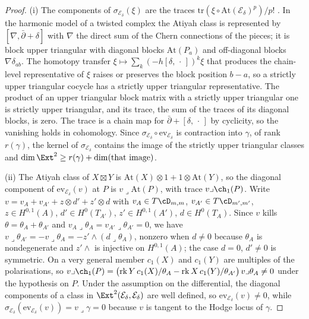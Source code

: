 \begin{proof}
(i) The components of $\sigma_{\mathcal{E}_{\delta}}(\xi)$ are the traces $\mathrm{tr}(\xi\circ\mathrm{At}(\mathcal{E}_{\delta})^{p})/p!$ \cite[Sect.~4]{BF03}. In the harmonic model of a twisted complex the Atiyah class is represented by $[\nabla,\bar\partial+\delta]$ with $\nabla$ the direct sum of the Chern connections of the pieces; it is block upper triangular with diagonal blocks $\mathrm{At}(P_{a})$ and off-diagonal blocks $\nabla\delta_{ab}$. The homotopy transfer $\xi\mapsto\sum_{k}(-h[\delta,\,\cdot\,])^{k}\xi$ that produces the chain-level representative of $\xi$ raises or preserves the block position $b-a$, so a strictly upper triangular cocycle has a strictly upper triangular representative. The product of an upper triangular block matrix with a strictly upper triangular one is strictly upper triangular, and its trace, the sum of the traces of its diagonal blocks, is zero. The trace is a chain map for $\bar\partial+[\delta,\,\cdot\,]$ by cyclicity, so the vanishing holds in cohomology. Since $\sigma_{\mathcal{E}_{\delta}}\circ\mathrm{ev}_{\mathcal{E}_{\delta}}$ is contraction into $\gamma$, of rank $r(\gamma)$, the kernel of $\sigma_{\mathcal{E}_{\delta}}$ contains the image of the strictly upper triangular classes and $\dim\Ext^{2}\ge r(\gamma)+\dim(\text{that image})$.

(ii) The Atiyah class of $X\boxtimes Y$ is $\mathrm{At}(X)\otimes1+1\otimes\mathrm{At}(Y)$, so the diagonal component of $\mathrm{ev}_{\mathcal{E}_{\delta}}(v)$ at $P$ is $v\lrcorner\mathrm{At}(P)$, with trace $v\lrcorner\ch_{1}(P)$. Write $v=v_{A}+v_{A'}+z\otimes d'+z'\otimes d$ with $v_{A}\in T\cD_{m,m}$, $v_{A'}\in T\cD_{m',m'}$, $z\in H^{0,1}(A)$, $d'\in H^{0}(T_{A'})$, $z'\in H^{0,1}(A')$, $d\in H^{0}(T_{A})$. Since $v$ kills $\theta=\theta_{A}+\theta_{A'}$ and $v_{A}\lrcorner\theta_{A}=v_{A'}\lrcorner\theta_{A'}=0$, we have $v\lrcorner\theta_{A'}=-v\lrcorner\theta_{A}=-z'\wedge(d\lrcorner\theta_{A})$, nonzero when $d\ne0$ because $\theta_{A}$ is nondegenerate and $z'\wedge$ is injective on $H^{0,1}(A)$; the case $d=0$, $d'\ne0$ is symmetric. On a very general member $c_{1}(X)$ and $c_{1}(Y)$ are multiples of the polarisations, so $v\lrcorner\ch_{1}(P)=\bigl(\operatorname{rk}Y\,c_{1}(X)/\theta_{A}-\operatorname{rk}X\,c_{1}(Y)/\theta_{A'}\bigr)\,v\lrcorner\theta_{A}\ne0$ under the hypothesis on $P$. Under the assumption on the differential, the diagonal components of a class in $\Ext^{2}(\mathcal{E}_{\delta},\mathcal{E}_{\delta})$ are well defined, so $\mathrm{ev}_{\mathcal{E}_{\delta}}(v)\ne0$, while $\sigma_{\mathcal{E}_{\delta}}(\mathrm{ev}_{\mathcal{E}_{\delta}}(v))=v\lrcorner\gamma=0$ because $v$ is tangent to the Hodge locus of $\gamma$.


\end{proof}
